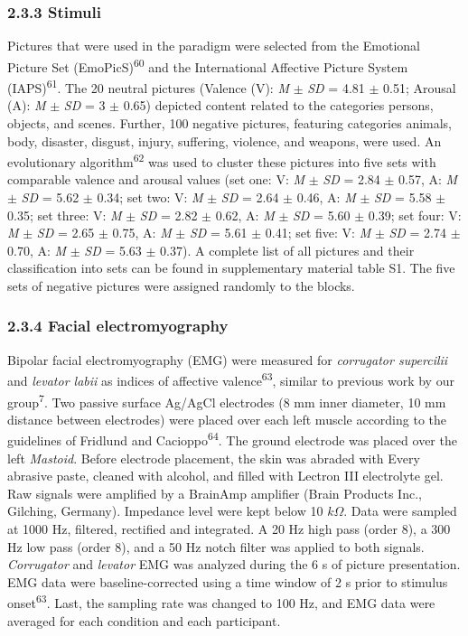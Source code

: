 \documentclass[
  man,floatsintext]{apa6}
\begin{document}
\hypertarget{stimuli}{%
\subsubsection{2.3.3 Stimuli}\label{stimuli}}

Pictures that were used in the paradigm were selected from the Emotional Picture Set (EmoPicS)\textsuperscript{60} and the International Affective Picture System (IAPS)\textsuperscript{61}.
The 20 neutral pictures (Valence (V): \emph{M} \(\pm\) \emph{SD} = 4.81 \(\pm\) 0.51; Arousal (A): \emph{M} \(\pm\) \emph{SD} = 3 \(\pm\) 0.65) depicted content related to the categories persons, objects, and scenes.
Further, 100 negative pictures, featuring categories animals, body, disaster, disgust, injury, suffering, violence, and weapons, were used.
An evolutionary algorithm\textsuperscript{62} was used to cluster these pictures into five sets with comparable valence and arousal values (set one: V: \emph{M} \(\pm\) \emph{SD} = 2.84 \(\pm\) 0.57, A: \emph{M} \(\pm\) \emph{SD} = 5.62 \(\pm\) 0.34; set two: V: \emph{M} \(\pm\) \emph{SD} = 2.64 \(\pm\) 0.46, A: \emph{M} \(\pm\) \emph{SD} = 5.58 \(\pm\) 0.35; set three: V: \emph{M} \(\pm\) \emph{SD} = 2.82 \(\pm\) 0.62, A: \emph{M} \(\pm\) \emph{SD} = 5.60 \(\pm\) 0.39; set four: V: \emph{M} \(\pm\) \emph{SD} = 2.65 \(\pm\) 0.75, A: \emph{M} \(\pm\) \emph{SD} = 5.61 \(\pm\) 0.41; set five: V: \emph{M} \(\pm\) \emph{SD} = 2.74 \(\pm\) 0.70, A: \emph{M} \(\pm\) \emph{SD} = 5.63 \(\pm\) 0.37).
A complete list of all pictures and their classification into sets can be found in supplementary material table S1.
The five sets of negative pictures were assigned randomly to the blocks.

\hypertarget{facial-electromyography}{%
\subsubsection{2.3.4 Facial electromyography}\label{facial-electromyography}}

Bipolar facial electromyography (EMG) were measured for \emph{corrugator supercilii} and \emph{levator labii} as indices of affective valence\textsuperscript{63}, similar to previous work by our group\textsuperscript{7}.
Two passive surface Ag/AgCl electrodes (8 mm inner diameter, 10 mm distance between electrodes) were placed over each left muscle according to the guidelines of Fridlund and Cacioppo\textsuperscript{64}.
The ground electrode was placed over the left \emph{Mastoid}.
Before electrode placement, the skin was abraded with Every abrasive paste, cleaned with alcohol, and filled with Lectron III electrolyte gel.
Raw signals were amplified by a BrainAmp amplifier (Brain Products Inc., Gilching, Germany).
Impedance level were kept below 10 \(k\Omega\).
Data were sampled at 1000 Hz, filtered, rectified and integrated.
A 20 Hz high pass (order 8), a 300 Hz low pass (order 8), and a 50 Hz notch filter was applied to both signals.
\emph{Corrugator} and \emph{levator} EMG was analyzed during the 6 s of picture presentation.
EMG data were baseline-corrected using a time window of 2 s prior to stimulus onset\textsuperscript{63}.
Last, the sampling rate was changed to 100 Hz, and EMG data were averaged for each condition and each participant.
\end{document}
